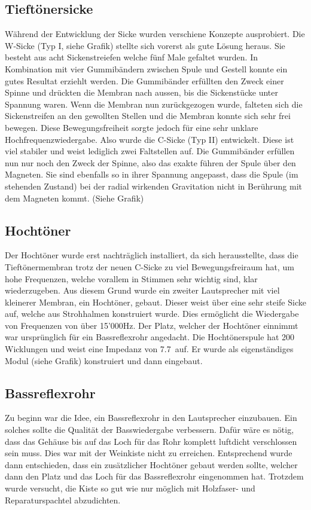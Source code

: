 \documentclass[a4paper,11pt]{report}
\begin{document}
\subsection{Tieftönersicke}
Während der Entwicklung der Sicke wurden verschiene Konzepte ausprobiert. Die W-Sicke (Typ I, siehe Grafik) stellte sich vorerst als gute Lösung heraus. Sie besteht aus acht Sickenstreiefen welche fünf Male gefaltet wurden. In Kombination mit vier Gummibändern zwischen Spule und Gestell konnte ein gutes Resultat erziehlt werden. Die Gummibänder erfüllten den Zweck einer Spinne und drückten die Membran nach aussen, bis die Sickenstücke unter Spannung waren. Wenn die Membran nun zurückgezogen wurde, falteten sich die Sickenstreifen an den gewollten Stellen und die Membran konnte sich sehr frei bewegen. Diese Bewegungsfreiheit sorgte jedoch für eine sehr unklare Hochfrequenzwiedergabe. Also wurde die C-Sicke (Typ II) entwickelt. Diese ist viel stabiler und weist lediglich zwei Faltstellen auf. Die Gummibänder erfüllen nun nur noch den Zweck der Spinne, also das exakte führen der Spule über den Magneten. Sie sind ebenfalls so in ihrer Spannung angepasst, dass die Spule (im stehenden Zustand) bei der radial wirkenden Gravitation nicht in Berührung mit dem Magneten kommt. (Siehe Grafik) 

\subsection{Hochtöner}
Der Hochtöner wurde erst nachträglich installiert, da sich herausstellte, dass die Tieftönermembran trotz der neuen C-Sicke zu viel Bewegungsfreiraum hat, um hohe Frequenzen, welche vorallem in Stimmen sehr wichtig sind, klar wiederzugeben. Aus diesem Grund wurde ein zweiter Lautsprecher mit viel kleinerer Membran, ein Hochtöner, gebaut. Dieser weist über eine sehr steife Sicke auf, welche aus Strohhalmen konstruiert wurde. Dies ermöglicht die Wiedergabe von Frequenzen von über 15'000Hz. Der Platz, welcher der Hochtöner einnimmt war ursprünglich für ein Bassreflexrohr angedacht. Die Hochtönerspule hat 200 Wicklungen und weist eine Impedanz von 7.7\Omega\  auf. Er wurde als eigenständiges Modul (siehe Grafik) konstruiert und dann eingebaut.

\subsection{Bassreflexrohr}
Zu beginn war die Idee, ein Bassreflexrohr in den Lautsprecher einzubauen. Ein solches sollte die Qualität der Basswiedergabe verbessern. Dafür wäre es nötig, dass das Gehäuse bis auf das Loch für das Rohr komplett luftdicht verschlossen sein muss. Dies war mit der Weinkiste nicht zu erreichen. Entsprechend wurde dann entschieden, dass ein zusätzlicher Hochtöner gebaut werden sollte, welcher dann den Platz und das Loch für das Bassreflexrohr eingenommen hat. Trotzdem wurde versucht, die Kiste so gut wie nur möglich mit Holzfaser- und Reparaturspachtel abzudichten. 
\end{document}
